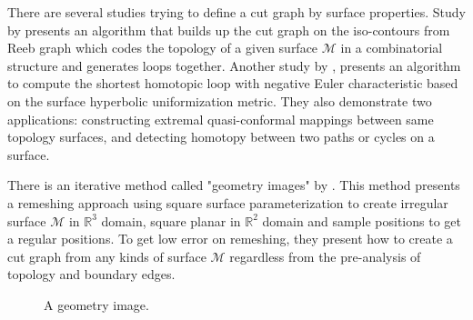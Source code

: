 \documentclass[a4paper,twoside]{article}
\begin{document}
There are several studies trying to define a cut graph by surface properties. Study by \cite{Patane:2007:FCB:1224804.1224947} presents an algorithm that builds up the cut graph on the iso-contours from Reeb graph which codes the topology of a given surface $\mathscr{M}$ in a combinatorial structure and generates loops together. Another study by \cite{Jin:2013:CSH:2396897.2396971}, presents an algorithm to compute the shortest homotopic loop with negative Euler characteristic based on the surface hyperbolic uniformization metric. They also demonstrate two applications: constructing extremal quasi-conformal mappings between same topology surfaces, and detecting homotopy between two paths or cycles on a surface. 

There is an iterative method called "geometry images" by \cite{Gu:2002:GI:566654.566589}. This method presents a remeshing approach using square surface parameterization to create irregular surface $\mathscr{M}$ in $\mathbb{R}^3$ domain, square planar in $\mathbb{R}^2$ domain and sample positions to get a regular positions. To get low error on remeshing, they present how to create a cut graph from any kinds of surface $\mathscr{M}$ regardless from the pre-analysis of topology and boundary edges.

\begin{figure}[!h]
	\centering
	
	\caption{A geometry image.}
	\label{fig:gim figure}
\end{figure}
\end{document}
